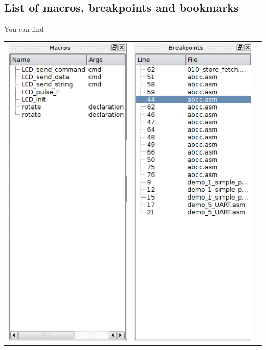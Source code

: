     \subsection{List of macros, breakpoints and bookmarks}
        You can find 
    \begin{table}[h!]
        \begin{tabular}{ccc}
            \includegraphics[width=.3\textwidth]{img/NewImg/listmacros.png}
                &
            \includegraphics[width=.3\textwidth]{img/NewImg/listbreakpoints.png}
                &

\end{tabular}
\end{table}
